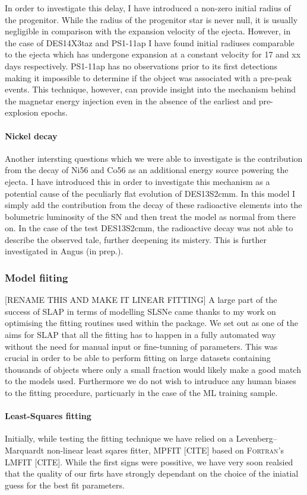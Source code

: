 In order to investigate this delay, I have introduced a non-zero initial radius of the progenitor. While the radius of the progenitor star is never null, it is usually negligible in comparison with the expansion velocity of the ejecta. However, in the case of DES14X3taz and PS1-11ap I have found initial radiuses comparable to the ejecta which has undergone expansion at a constant velocity for 17 and xx days respectively. PS1-11ap has no observations prior to its first detections making it impossible to determine if the object was associated with a pre-peak events. This technique, however, can provide insight into the mechanism behind the magnetar energy injection even in the absence of the earliest and pre-explosion epochs.

\paragraph{Nickel decay}
Another intersting questions which we were able to investigate is the contribution from the decay of Ni56 and Co56 as an additional energy source powering the ejecta. I have introduced this in order to investigate this mechanism as a potential cause of the peculiarly flat evolution of DES13S2cmm. In this model I simply add the contribution from the decay of these radioactive elements into the bolumetric luminosity of the SN and then treat the model as normal from there on. In the case of the test DES13S2cmm, the radioactive decay was not able to describe the observed tale, further deepening its mistery. This is further investigated in Angus (in prep.).

\subsubsection{Model fiiting}
[RENAME THIS AND MAKE IT LINEAR FITTING]
A large part of the success of SLAP in terms of modelling SLSNe came thanks to my work on optimising the fitting routines used within the package. We set out as one of the aims for \textsc{SLAP} that all the fitting has to happen in a fully automated way without the need for manual input or fine-tunning of parameters. This was crucial in order to be able to perform fitting on large datasets containing thousands of objects where only a small fraction would likely make a good match to the models used. Furthermore we do not wish to intruduce any human biases to the fitting procedure, particuarly in the case of the ML training sample.

\paragraph{Least-Squares fitting}
Initially, while testing the fitting technique we have relied on a Levenberg–Marquardt non-linear least sqares fitter, \textsc{MPFIT} [CITE] based on \textsc{Fortran}'s \textsc{LMFIT} [CITE]. While the first signs were possitive, we have very soon realsied that the quality of our firts have strongly dependant on the choice of the iniatial guess for the best fit parameters.

